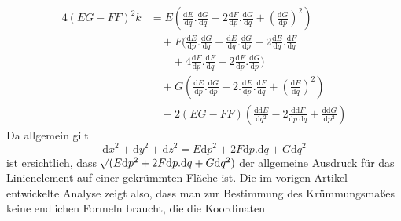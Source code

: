 \[
\begin{aligned}
4(EG-FF)^2k&=E(\tfrac{\mathrm{d}E}{\mathrm{d}q}\mathord{.}\tfrac{\mathrm{d}G}{\mathrm{d}q}-2\tfrac{\mathrm{d}F}{\mathrm{d}p}\mathord{.}\tfrac{\mathrm{d}G}{\mathrm{d}q}+(\tfrac{\mathrm{d}G}{\mathrm{d}p})^2)\\
&\quad+F(\tfrac{\mathrm{d}E}{\mathrm{d}p}\mathord{.}\tfrac{\mathrm{d}G}{\mathrm{d}q}-\tfrac{\mathrm{d}E}{\mathrm{d}q}\mathord{.}\tfrac{\mathrm{d}G}{\mathrm{d}p}-2\tfrac{\mathrm{d}E}{\mathrm{d}q}\mathord{.}\tfrac{\mathrm{d}F}{\mathrm{d}q}\\
&\qquad+4\tfrac{\mathrm{d}F}{\mathrm{d}p}\mathord{.}\tfrac{\mathrm{d}F}{\mathrm{d}q}-2\tfrac{\mathrm{d}F}{\mathrm{d}p}\mathord{.}\tfrac{\mathrm{d}G}{\mathrm{d}p})\\
&\quad+G(\tfrac{\mathrm{d}E}{\mathrm{d}p}\mathord{.}\tfrac{\mathrm{d}G}{\mathrm{d}p}-2\mathord{.}\tfrac{\mathrm{d}E}{\mathrm{d}p}\mathord{.}\tfrac{\mathrm{d}F}{\mathrm{d}q}+(\tfrac{\mathrm{d}E}{\mathrm{d}q})^2)\\
&\quad-2(EG-FF)(\tfrac{\mathrm{d}\mathrm{d}E}{\mathrm{d}q^2}-2\tfrac{\mathrm{d}\mathrm{d}F}{\mathrm{d}p\mathord{.}\mathrm{d}q}+\tfrac{\mathrm{d}\mathrm{d}G}{\mathrm{d}p^2})
\end{aligned}
\]
Da allgemein gilt
\[
\mathrm{d}x^2+\mathrm{d}y^2+\mathrm{d}z^2=E\mathrm{d}p^2+2F\mathrm{d}p\mathord{.}\mathrm{d}q+G\mathrm{d}q^2
\]
ist ersichtlich, dass \(\mathord{{}^{}\!\surd}(E\mathrm{d}p^2+2F\mathrm{d}p\mathord{.}\mathrm{d}q+G\mathrm{d}q^2)\) der allgemeine Ausdruck für das Linienelement auf einer gekrümmten Fläche ist. Die im vorigen Artikel entwickelte Analyse zeigt also, dass man zur Bestimmung des Krümmungsmaßes keine endlichen Formeln braucht, die die Koordinaten
